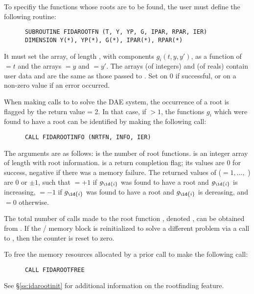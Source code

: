 To specifiy the functions whose roots are to be found, the user must
define the following routine:
\begin{verbatim}
      SUBROUTINE FIDAROOTFN (T, Y, YP, G, IPAR, RPAR, IER)
      DIMENSION Y(*), YP(*), G(*), IPAR(*), RPAR(*)
\end{verbatim}
It must set the  array, of length , with components
$g_i(t,y,y')$, as a function of  $= t$ and the arrays  $= y$
and  $= y'$.
The arrays  (of integers) and  (of reals) contain user data
and are the same as those passed to .
Set  on 0 if successful, or on a non-zero value if an error occurred.

When making calls to  to solve the DAE system, the occurrence
of a root is flagged by the return value  = 2.  In that case, if
 $> 1$, the functions $g_i$ which were found to have a root can
be identified by making the following call:
\begin{verbatim}
      CALL FIDAROOTINFO (NRTFN, INFO, IER)
\end{verbatim}
The arguments are as follows:  is the number of root functions.
 is an integer array of length  with root information.
 is a return completion flag; its values are $0$ for success, 
negative if there was a memory failure.  The returned values of 
($ = 1,\ldots,$ ) are $0$ or $\pm 1$, such that 
 $ = +1$ if $g_{\id{i}}$ was found to have a root and $g_{\id{i}}$ is increasing,
 $ = -1$ if $g_{\id{i}}$ was found to have a root and $g_{\id{i}}$ is dereasing,
and  $ = 0$ otherwise.

The total number of calls made to the root function ,
denoted , can be obtained from .
If the {\fida}/{\ida} memory block is reinitialized to solve a
different problem via a call to , then the counter
 is reset to zero.

To free the memory resources allocated by a prior call to  make
the following call:
\begin{verbatim}
      CALL FIDAROOTFREE
\end{verbatim}
See \S\ref{ss:idarootinit} for additional information on the
rootfinding feature.



